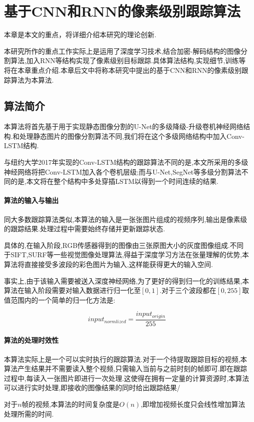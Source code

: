 
\chapter{基于CNN和RNN的像素级别跟踪算法}
本章是本文的重点，将详细介绍本研究的理论创新.
\par
本研究所作的重点工作实际上是运用了深度学习技术,结合加密-解码结构的图像分割算法,加入RNN等结构实现了像素级别目标跟踪.具体算法结构,实现细节,训练等将在本章重点介绍.本章后文中将称本研究中提出的基于CNN和RNN的像素级别跟踪算法为本算法.

\section{算法简介}
本算法将首先基于用于实现静态图像分割的U-Net\supercite{ronneberger2015u}的多级降级-升级卷机神经网络结构.和处理静态图片的图像分割算法不同,我们将在这个多级网络结构中加入Conv-LSTM结构.
\par
与纽约大学2017年实现的Conv-LSTM结构的跟踪算法不同的是,本文所采用的多级神经网络将把Conv-LSTM加入各个卷机层级;而与U-Net,SegNet等多级分割算法不同的是,本文将在整个结构中多处穿插LSTM以得到一个时间连续的结果.

\subsubsection{算法的输入与输出}
同大多数跟踪算法类似,本算法的输入是一张张图片组成的视频序列,输出是像素级的跟踪结果.处理过程中需要始终存储并更新跟踪状态.
\par
具体的,在输入阶段,RGB传感器得到的图像由三张原图大小的灰度图像组成.不同于SIFT\supercite{lowe1999object},SURF\supercite{bay2006surf}等一些视觉图像处理算法,得益于深度学习方法在张量理解的优势,本算法将直接接受多波段的彩色图片为输入,这样能获得更大的输入空间.
\par
事实上,由于该输入需要被送入深度神经网络,为了更好的得到归一化的训练结果,本算法在输入阶段需要对输入数据进行归一化至$[0,1]$.对于三个波段都在$[0,255]$取值范围内的一个简单的归一化方法是:
\par
\begin{equation}\label{equ:input_norm}  input_{normlized} = \frac{input_{origin}}{255}  \end{equation}
\par

\subsubsection{算法的处理时效性}
本算法实际上是一个可以实时执行的跟踪算法.对于一个待提取跟踪目标的视频,本算法产生结果并不需要读入整个视频,只需输入当前与之前时刻的帧即可.即在跟踪过程中,每读入一张图片即进行一次处理.这使得在拥有一定量的计算资源时,本算法可以进行实时处理,即接收的图像结果的同时给出跟踪结果/
\par
对于$n$帧的视频,本算法的时间复杂度是$O(n)$,即增加视频长度只会线性增加算法处理所需的时间.


